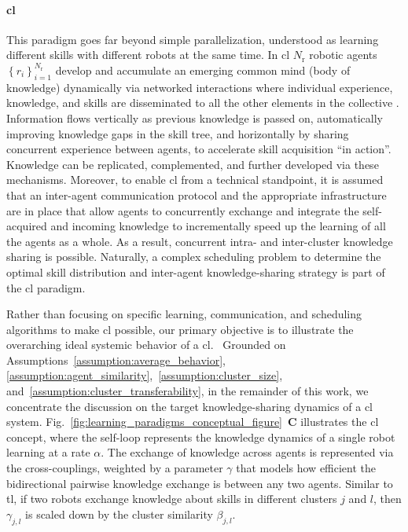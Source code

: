 \documentclass[12pt]{article}
\begin{document}

\paragraph*{\textbf{\Acl{cl}}}
This paradigm goes far beyond simple parallelization, understood as learning different skills with different robots at the same time. In \ac{cl} $N_\mathrm{r}$ robotic agents $ \left\lbrace r_i \right\rbrace_{i=1}^{N_\mathrm{r}} $ develop and accumulate an emerging common mind (body of knowledge) dynamically via networked interactions where individual experience, knowledge, and skills are disseminated to all the other elements in the collective \cite{Garavan2012CollectiveLearning}. Information flows vertically as previous knowledge is passed on, automatically improving knowledge gaps in the skill tree, and horizontally by sharing concurrent experience between agents, to accelerate skill acquisition ``in action''. Knowledge can be replicated, complemented, and further developed via these mechanisms. Moreover, to enable \ac{cl} from a technical standpoint, it is assumed that an inter-agent communication protocol and the appropriate infrastructure are in place that allow agents to concurrently exchange and integrate the self-acquired and incoming knowledge to incrementally speed up the learning of all the agents as a whole. As a result, concurrent intra- and inter-cluster knowledge sharing is possible. Naturally, a complex scheduling problem to determine the optimal skill distribution and inter-agent knowledge-sharing strategy is part of the \ac{cl} paradigm. 

Rather than focusing on specific learning, communication, and scheduling algorithms to make \ac{cl} possible, our primary objective is to illustrate the overarching ideal systemic behavior of a \acl{cl}.~%
Grounded on Assumptions~\ref{assumption:average_behavior}, \ref{assumption:agent_similarity},~\ref{assumption:cluster_size}, and~\ref{assumption:cluster_transferability}, in the remainder of this work, we concentrate the discussion on the target knowledge-sharing dynamics of a \ac{cl} system. Fig.~\ref{fig:learning_paradigms_conceptual_figure}~\textbf{C} illustrates the \ac{cl} concept, where the self-loop represents the knowledge dynamics of a single robot learning at a rate $\alpha$. The exchange of knowledge across agents is represented via the cross-couplings, weighted by a parameter $\gamma$ that models how efficient the bidirectional pairwise knowledge exchange is between any two agents. Similar to \ac{tl}, if two robots exchange knowledge about skills in different clusters $j$ and $l$, then $\gamma_{j,l}$ is scaled down by the cluster similarity $\beta_{j,l}$. 
\end{document}
